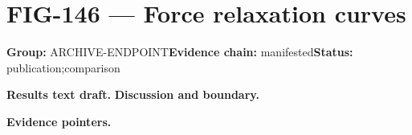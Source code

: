 \clearpage
\section{FIG-146 --- Force relaxation curves}
\label{figpage:fig-146}
\textbf{Group:} ARCHIVE-ENDPOINT\quad \textbf{Evidence chain:} manifested\quad \textbf{Status:} publication;comparison

\textbf{Results text draft.} 
\textbf{Discussion and boundary.} 


\textbf{Evidence pointers.}



\vfill
